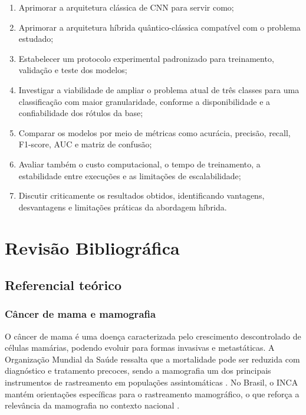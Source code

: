 \documentclass[
    12pt,
    openright,
    oneside,
    a4paper,
    english,
    brazil
]{abntex2}
\begin{document}
\begin{enumerate}
    \item Aprimorar a arquitetura clássica de CNN para servir como;
    \item Aprimorar a arquitetura híbrida quântico-clássica compatível com o problema estudado;
    \item Estabelecer um protocolo experimental padronizado para treinamento, validação e teste dos modelos;
    \item Investigar a viabilidade de ampliar o problema atual de três classes para uma classificação com maior granularidade, conforme a disponibilidade e a confiabilidade dos rótulos da base;
    \item Comparar os modelos por meio de métricas como acurácia, precisão, recall, F1-score, AUC e matriz de confusão;
    \item Avaliar também o custo computacional, o tempo de treinamento, a estabilidade entre execuções e as limitações de escalabilidade;
    \item Discutir criticamente os resultados obtidos, identificando vantagens, desvantagens e limitações práticas da abordagem híbrida.
\end{enumerate}

\chapter{Revisão Bibliográfica}
\label{cap:revisao}


\section{Referencial teórico}
\label{sec:referencial}

\subsection{Câncer de mama e mamografia}

O câncer de mama é uma doença caracterizada pelo crescimento descontrolado de células mamárias, podendo evoluir para formas invasivas e metastáticas. A Organização Mundial da Saúde ressalta que a mortalidade pode ser reduzida com diagnóstico e tratamento precoces, sendo a mamografia um dos principais instrumentos de rastreamento em populações assintomáticas \cite{WHO2025BreastCancer}. No Brasil, o INCA mantém orientações específicas para o rastreamento mamográfico, o que reforça a relevância da mamografia no contexto nacional \cite{INCA2025Rastreamento}.
\end{document}
